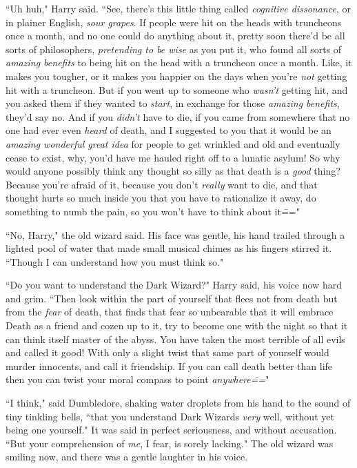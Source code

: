 ``Uh huh," Harry said. ``See, there's this little thing called \emph{cognitive dissonance}, or in plainer English, \emph{sour grapes}. If people were hit on the heads with truncheons once a month, and no one could do anything about it, pretty soon there'd be all sorts of philosophers, \emph{pretending to be wise} as you put it, who found all sorts of \emph{amazing benefits} to being hit on the head with a truncheon once a month. Like, it makes you tougher, or it makes you happier on the days when you're \emph{not} getting hit with a truncheon. But if you went up to someone who \emph{wasn't} getting hit, and you asked them if they wanted to \emph{start}, in exchange for those \emph{amazing benefits}, they'd say no. And if you \emph{didn't} have to die, if you came from somewhere that no one had ever even \emph{heard} of death, and I suggested to you that it would be an \emph{amazing wonderful great idea} for people to get wrinkled and old and eventually cease to exist, why, you'd have me hauled right off to a lunatic asylum! So why would anyone possibly think any thought so silly as that death is a \emph{good} thing? Because you're afraid of it, because you don't \emph{really} want to die, and that thought hurts so much inside you that you have to rationalize it away, do something to numb the pain, so you won't have to think about it\==="

``No, Harry," the old wizard said. His face was gentle, his hand trailed through a lighted pool of water that made small musical chimes as his fingers stirred it. ``Though I can understand how you must think so."

``Do you want to understand the Dark Wizard?" Harry said, his voice now hard and grim. ``Then look within the part of yourself that flees not from death but from the \emph{fear} of death, that finds that fear so unbearable that it will embrace Death as a friend and cozen up to it, try to become one with the night so that it can think itself master of the abyss. You have taken the most terrible of all evils and called it good! With only a slight twist that same part of yourself would murder innocents, and call it friendship. If you can call death better than life then you can twist your moral compass to point \emph{anywhere\===}"

``I think," said Dumbledore, shaking water droplets from his hand to the sound of tiny tinkling bells, ``that you understand Dark Wizards \emph{very} well, without yet being one yourself." It was said in perfect seriousness, and without accusation. ``But your comprehension of \emph{me}, I fear, is sorely lacking." The old wizard was smiling now, and there was a gentle laughter in his voice.

